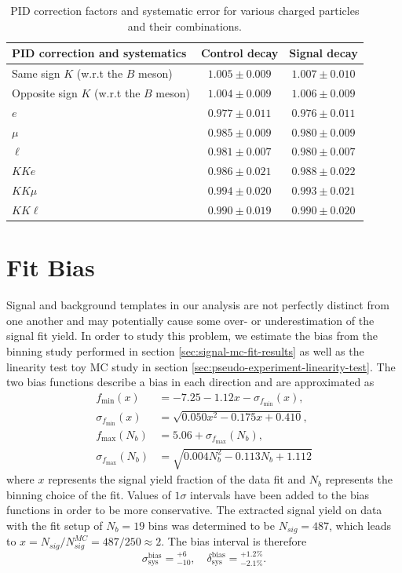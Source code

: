 \begin{table}[H]
	\centering
	\begin{tabular}{|l|c|c|}
		\hline
		PID correction and systematics & Control decay & Signal decay \\
		\hline
		Same sign $K$ (w.r.t the $B$ meson) & $1.005\pm 0.009$ & $1.007\pm 0.010$\\
		\hline
		Opposite sign $K$ (w.r.t the $B$ meson) & $1.004\pm 0.009$ & $1.006\pm 0.009$\\
		\hline
		$e$ & $0.977\pm 0.011$ & $0.976\pm 0.011$\\
		\hline
		$\mu$ & $0.985\pm 0.009$ & $0.980\pm 0.009$\\
		\hline
		$\ell$ & $0.981\pm 0.007$ & $0.980\pm 0.007$\\
		\hline
		\hline
		$KKe$ & $0.986 \pm 0.021$ & $0.988\pm 0.022$\\
		\hline
		$KK\mu$ & $0.994 \pm 0.020$ & $0.993\pm 0.021$\\
		\hline
		$KK\ell$ & $0.990 \pm 0.019$ & $0.990\pm 0.020$\\
		\hline
	\end{tabular}
	\captionsetup{width=0.8\linewidth}
	\caption{PID correction factors and systematic error for various charged particles and their combinations.}
	\label{tab:PID}
\end{table}

\section{Fit Bias}
Signal and background templates in our analysis are not perfectly distinct from one another and may potentially cause some over- or underestimation of the signal fit yield. In order to study this problem, we estimate the bias from the binning study performed in section \ref{sec:signal-mc-fit-results} as well as the linearity test toy MC study in section \ref{sec:pseudo-experiment-linearity-test}. The two bias functions describe a bias in each direction and are approximated as
\begin{align}
f_{\mathrm{min}}(x) &= -7.25-1.12x - \sigma_{f_{\mathrm{min}}}(x), \\
\sigma_{f_{\mathrm{min}}}(x) &= \sqrt{0.050 x^2 - 0.175 x + 0.410}, \\
f_{\mathrm{max}}(N_b) &= 5.06 + \sigma_{f_{\mathrm{max}}}(N_b), \\
\sigma_{f_{\mathrm{max}}}(N_b) &= \sqrt{0.004N_b^2 - 0.113 N_b + 1.112}
\end{align}
where $x$ represents the signal yield fraction of the data fit and $N_b$ represents the binning choice of the fit. Values of $1\sigma$ intervals have been added to the bias functions in order to be more conservative. The extracted signal yield on data  with the fit setup of $N_b=19$ bins was determined to be $N_{sig} = 487$, which leads to $x = N_{sig} / N_{sig}^{MC} = 487 / 250 \approx 2$. The bias interval is therefore
\begin{equation}
\sigma_{\mathrm{sys}}^{\mathrm{bias}} = {}^{+6}_{-10},\quad \delta_{\mathrm{sys}}^{\mathrm{bias}} = {}^{+1.2\%}_{-2.1\%}.
\end{equation}


